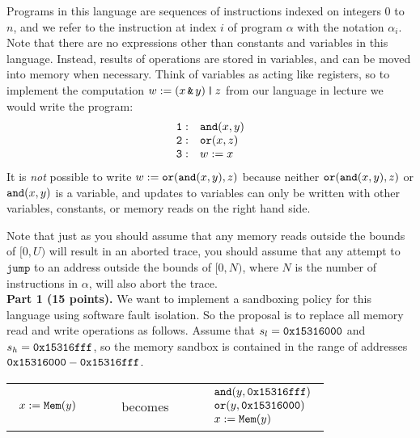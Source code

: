 \documentclass[10pt]{article}
\newcommand{\pand}[2]{\keywordfont{and}(#1, #2)}
\newcommand{\por}[2]{\keywordfont{or}(#1, #2)}
\begin{document}
\begin{enumerate}
Programs in this language are sequences of instructions indexed on integers $0$ to $n$, and we refer to the instruction at index $i$ of program $\alpha$ with the notation $\alpha_i$. Note that there are no expressions other than constants and variables in this language. Instead, results of operations are stored in variables, and can be moved into memory when necessary. Think of variables as acting like registers, so to implement the computation $w := (x \operatorname{\texttt{\upshape \&}} y) \operatorname{\texttt{\upshape |}} z$ from our language in lecture we would write the program:
\[
\begin{array}{ll}
\keywordfont{1}: & \pand{x}{y} \\
\keywordfont{2}: & \por{x}{z} \\
\keywordfont{3}: & w := x
\end{array}
\]
It is \emph{not} possible to write $w := \por{\pand{x}{y}}{z}$ because neither $\por{\pand{x}{y}}{z}$ or $\pand{x}{y}$ is a variable, and updates to variables can only be written with other variables, constants, or memory reads on the right hand side.

Note that just as you should assume that any memory reads outside the bounds of $[0, U)$ will result in an aborted trace, you should assume that any attempt to $\mathtt{jump}$ to an address outside the bounds of $[0, N)$, where $N$ is the number of instructions in $\alpha$, will also abort the trace.
\\[1em]

\textbf{Part 1 (15 points).} We want to implement a sandboxing policy for this language using software fault isolation. So the proposal is to replace all memory read and write operations as follows. Assume that $s_l = \texttt{\upshape 0x15316000}$ and $s_h = \texttt{\upshape 0x15316fff}$, so the memory sandbox is contained in the range of addresses $\texttt{\upshape 0x15316000} - \texttt{\upshape 0x15316fff}$.
\begin{center}
\begin{tabular}{lcl}
$
\begin{array}{l}
x := \texttt{\upshape Mem}(y)
\end{array}
$
&
\ \ \ \ becomes\ \ \ \ 
&
$
\begin{array}{l}
\pand{y}{\keywordfont{0x15316fff}} \\
\por{y}{\keywordfont{0x15316000}} \\
x := \pderef{y}
\end{array}
$
\end{tabular}


\end{center}
\end{enumerate}
\end{document}
